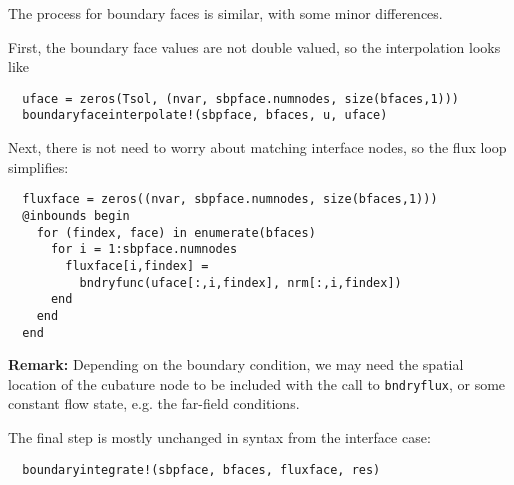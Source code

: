 \documentclass[11pt]{article} %
\makeatletter
\newcommand{\eg}[0]{{e.g.\@}\xspace}
\makeatother
\begin{document}
The process for boundary faces is similar, with some minor differences.

First, the boundary face values are not double valued, so the interpolation
looks like
\begin{lstlisting}
  uface = zeros(Tsol, (nvar, sbpface.numnodes, size(bfaces,1)))
  boundaryfaceinterpolate!(sbpface, bfaces, u, uface)
\end{lstlisting}

Next, there is not need to worry about matching interface nodes, so the flux
loop simplifies:
\begin{lstlisting}
  fluxface = zeros((nvar, sbpface.numnodes, size(bfaces,1)))
  @inbounds begin
    for (findex, face) in enumerate(bfaces)
      for i = 1:sbpface.numnodes
        fluxface[i,findex] =
          bndryfunc(uface[:,i,findex], nrm[:,i,findex])
      end
    end
  end
\end{lstlisting}

\noindent\textbf{Remark:} Depending on the boundary condition, we may need the
spatial location of the cubature node to be included with the call to
\texttt{bndryflux}, or some constant flow state, \eg the far-field conditions.

The final step is mostly unchanged in syntax from the interface case:
\begin{lstlisting}
  boundaryintegrate!(sbpface, bfaces, fluxface, res)
\end{lstlisting}
\end{document}
